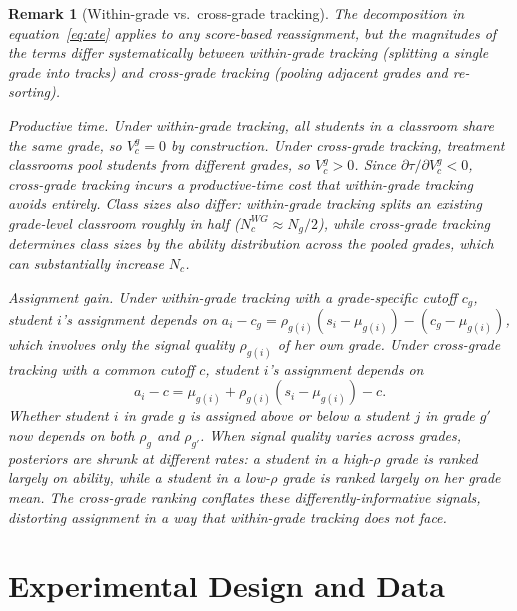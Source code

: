 \documentclass[11pt]{article}
\newtheorem{remark}{Remark}
\begin{document}
\begin{remark}[Within-grade vs.\ cross-grade tracking]
\label{rem:wg_cg}
The decomposition in equation~\eqref{eq:ate} applies to any score-based reassignment, but the magnitudes of the terms differ systematically between within-grade tracking (splitting a single grade into tracks) and cross-grade tracking (pooling adjacent grades and re-sorting).

\emph{Productive time.} Under within-grade tracking, all students in a classroom share the same grade, so $V^g_c = 0$ by construction. Under cross-grade tracking, treatment classrooms pool students from different grades, so $V^g_c > 0$. Since $\partial\tau/\partial V^g_c < 0$, cross-grade tracking incurs a productive-time cost that within-grade tracking avoids entirely. Class sizes also differ: within-grade tracking splits an existing grade-level classroom roughly in half ($N^{WG}_c \approx N_g/2$), while cross-grade tracking determines class sizes by the ability distribution across the pooled grades, which can substantially increase $N_c$.

\emph{Assignment gain.} Under within-grade tracking with a grade-specific cutoff $c_g$, student $i$'s assignment depends on $a_i - c_g = \rho_{g(i)}(s_i - \mu_{g(i)}) - (c_g - \mu_{g(i)})$, which involves only the signal quality $\rho_{g(i)}$ of her own grade. Under cross-grade tracking with a common cutoff $c$, student $i$'s assignment depends on
\begin{equation}
\label{eq:cg_assign}
a_i - c = \mu_{g(i)} + \rho_{g(i)}(s_i - \mu_{g(i)}) - c.
\end{equation}
Whether student $i$ in grade $g$ is assigned above or below a student $j$ in grade $g'$ now depends on both $\rho_g$ and $\rho_{g'}$. When signal quality varies across grades, posteriors are shrunk at different rates: a student in a high-$\rho$ grade is ranked largely on ability, while a student in a low-$\rho$ grade is ranked largely on her grade mean. The cross-grade ranking conflates these differently-informative signals, distorting assignment in a way that within-grade tracking does not face.
\end{remark}

\section{Experimental Design and Data}
\label{sec:design}
\end{document}
